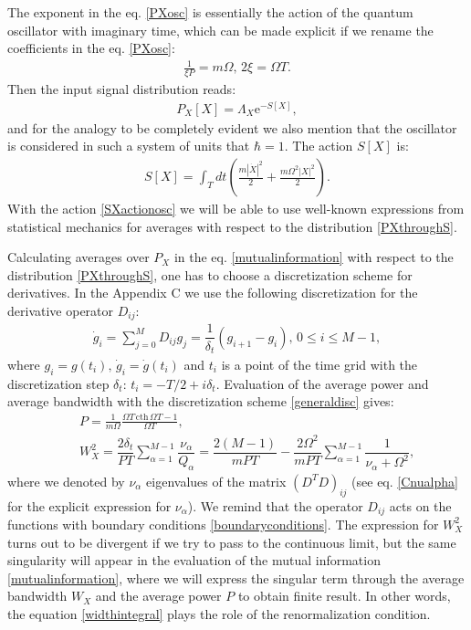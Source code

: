 \documentclass{article}
\begin{document}
The exponent in the eq. \eqref{PXosc} is essentially the action of the quantum oscillator with imaginary time, which can be made explicit if we rename the coefficients in the eq. \eqref{PXosc}:
\begin{eqnarray}\label{momeganotation}
    \frac{1}{\xi P} = m \Omega, \, 2\xi=\Omega T.
\end{eqnarray}
Then the input signal distribution reads: 
\begin{eqnarray}\label{PXthroughS}
    P_{X}[X] = \Lambda_{X}\textrm{e}^{-S[X]},
\end{eqnarray}
and for the analogy to be completely evident we also mention that the oscillator is considered in such a system of units that $\hbar = 1$. The action $S[X]$ is:
\begin{eqnarray}\label{SXactionosc}
    S[X] = \int_{T} dt \left(\frac{m |\dot{X}|^{2}}{2}+\frac{m\Omega^{2}|X|^{2}}{2}\right).
\end{eqnarray}
With the action \eqref{SXactionosc} we will be able to use well-known expressions from statistical mechanics for averages with respect to the distribution \eqref{PXthroughS}. 

Calculating averages over $P_{X}$ in the eq. \eqref{mutualinformation} with respect to the distribution \eqref{PXthroughS}, one has to choose a discretization scheme for derivatives. In the Appendix C we use the following discretization for the derivative operator $D_{ij}$:
\begin{eqnarray}\label{generaldisc}
    \dot{g}_{i}=\sum_{j=0}^{M}D_{ij}g_{j} = \dfrac{1}{\delta_{t}}\left(g_{i+1}-g_{i}\right), \, 0 \leq i \leq M-1,
\end{eqnarray}
where $g_{i} = g(t_{i}), \, \dot{g}_{i} = \dot{g}(t_{i})$  and $t_{i}$ is a point of the time grid with the discretization step $\delta_{t}$: $t_{i} = -T/2 + i\delta_{t}$. Evaluation of the average power and average bandwidth with the discretization scheme \eqref{generaldisc} gives: 
\begin{eqnarray}
    && P = \frac{1}{m\Omega}\frac{\Omega T\,\textrm{cth}\,\Omega T - 1}{\Omega T}, \\ \nonumber
    && W_{X}^{2} = \dfrac{2\delta_{t}}{PT}\sum_{\alpha=1}^{M-1}\dfrac{\nu_{\alpha}}{Q_{\alpha}} = \dfrac{2(M-1)}{mPT} - \dfrac{2\Omega^{2}}{mPT}\sum_{\alpha=1}^{M-1}\dfrac{1}{\nu_{\alpha}+\Omega^{2}},
\end{eqnarray}
where we denoted by $\nu_{\alpha}$ eigenvalues of the matrix $(D^{T}D)_{ij}$ (see eq. \eqref{Cnualpha} for the explicit expression for $\nu_{\alpha}$). We remind that the operator $D_{ij}$ acts on the functions with boundary conditions \eqref{boundaryconditions}. The expression for $W_{X}^{2}$ turns out to be divergent if we try to pass to the continuous limit, but the same singularity will appear in the evaluation of the mutual information \eqref{mutualinformation}, where we will express the singular term through the average bandwidth $W_{X}$ and the average power $P$ to obtain finite result. In other words, the equation \eqref{widthintegral} plays the role of the renormalization condition. 
\end{document}
